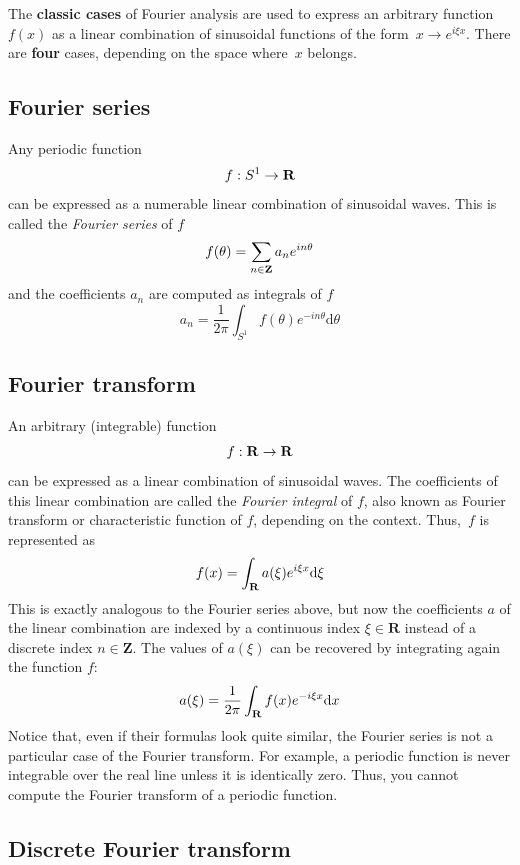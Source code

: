 The {\bf classic cases} of Fourier analysis are used to express an
arbitrary function~$f(x)$ as a linear combination of sinusoidal functions
of the form~$x\to e^{i\xi x}$.  There are {\bf four} cases, depending on
the space where~$x$ belongs.

\subsection{Fourier series}

Any periodic function
$$
f:S^1\to\mathbf{R}
$$
can be expressed as a numerable linear combination of sinusoidal waves. This is
called the \emph{Fourier series} of $f$
$$
	f(\theta) = \sum_{n\in\mathbf{Z}} a_n e^{in\theta}
$$
and the coefficients $a_n$ are computed as integrals of $f$
$$
	a_n = \frac{1}{2\pi}\int_{S^1} f(\theta) e^{-in\theta}
\mathrm{d}\theta
$$


\subsection{Fourier transform}

An arbitrary (integrable) function
$$
f:\mathbf{R}\to\mathbf{R}
$$
can be expressed as a linear combination of sinusoidal waves.  The
coefficients of this linear combination are called the \emph{Fourier
integral} of $f$, also known as Fourier transform or characteristic
function of $f$, depending on the context.  Thus,~$f$ is represented
as
$$
f(x) = \int_{\mathbf{R}} a(\xi) e^{i\xi x} \mathrm{d} \xi
$$
This is exactly analogous to the Fourier series above, but now the coefficients
$a$ of the linear combination are indexed by a continuous index
$\xi\in\mathbf{R}$ instead of a discrete index $n\in\mathbf{Z}$.  The values
of $a(\xi)$ can be recovered by integrating again the function $f$:
$$
a(\xi) = \frac{1}{2\pi}\int_{\mathbf{R}} f(x) e^{-i\xi x} \mathrm{d} x
$$
Notice that, even if their formulas look quite similar, the Fourier
series is not a particular case of the Fourier transform.  For
example, a periodic function is never integrable over the real line
unless it is identically zero.  Thus, you cannot compute the Fourier
transform of a periodic function.



\subsection{Discrete Fourier transform}

